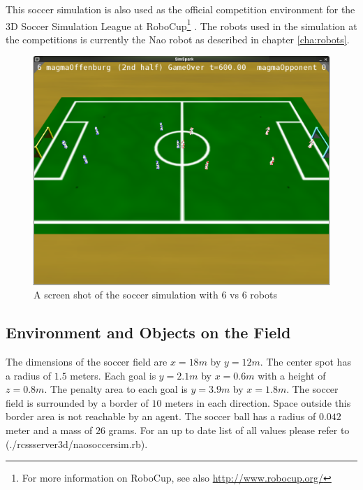 This soccer simulation is also used as the official competition environment for
the 3D Soccer Simulation League at RoboCup\footnote{For more information on
RoboCup, see also \url{http://www.robocup.org/}}
\cite{KAK+97}\cite{KA00}\cite{BMO+05}\cite{MBS+07}. The robots used in the
simulation at the competitions is currently the Nao robot as described in
chapter \ref{cha:robots}.\newline

\begin{figure}[htbp]
  \centering
  \includegraphics[width=\textwidth]{fig/soccersim}
  \caption{A screen shot of the soccer simulation with 6 vs 6 robots}
  \label{fig:soccersim}
\end{figure}





\subsection{Environment and Objects on the Field}
The dimensions of the soccer field are $x=18m$ by $y=12m$. The center spot has a
radius of $1.5$ meters. Each goal is $y=2.1m$ by $x=0.6m$ with a height of
$z=0.8m$. The penalty area to each goal is $y=3.9m$ by $x=1.8m$. The soccer
field is surrounded by a border of $10$ meters in each direction. Space outside
this border area is not reachable by an agent. The soccer ball has a radius of
$0.042$ meter and a mass of $26$ grams. For an up to date list of all values
please refer to (./rcssserver3d/naosoccersim.rb).

